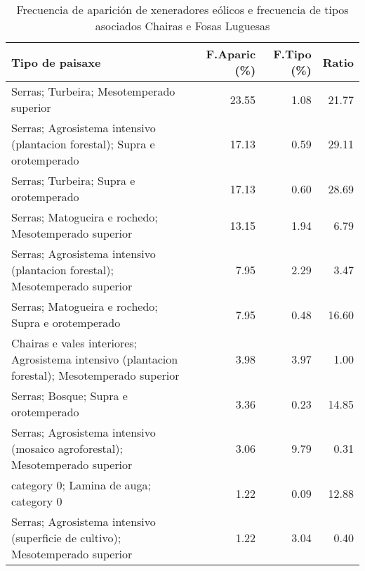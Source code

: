 \begin{table}[p]
\centering
\caption{Frecuencia de aparición de xeneradores eólicos e frecuencia de tipos asociados Chairas e Fosas Luguesas} 
\label{veolico6}
\begin{tabular}{lrrr}
  \hline
Tipo de paisaxe & F.Aparic (\%) & F.Tipo (\%) & Ratio \\ 
  \hline
Serras; Turbeira; Mesotemperado superior & 23.55 & 1.08 & 21.77 \\ 
  Serras; Agrosistema intensivo (plantacion forestal); Supra e orotemperado & 17.13 & 0.59 & 29.11 \\ 
  Serras; Turbeira; Supra e orotemperado & 17.13 & 0.60 & 28.69 \\ 
  Serras; Matogueira e rochedo; Mesotemperado superior & 13.15 & 1.94 & 6.79 \\ 
  Serras; Agrosistema intensivo (plantacion forestal); Mesotemperado superior & 7.95 & 2.29 & 3.47 \\ 
  Serras; Matogueira e rochedo; Supra e orotemperado & 7.95 & 0.48 & 16.60 \\ 
  Chairas e vales interiores; Agrosistema intensivo (plantacion forestal); Mesotemperado superior & 3.98 & 3.97 & 1.00 \\ 
  Serras; Bosque; Supra e orotemperado & 3.36 & 0.23 & 14.85 \\ 
  Serras; Agrosistema intensivo (mosaico agroforestal); Mesotemperado superior & 3.06 & 9.79 & 0.31 \\ 
  category 0; Lamina de auga; category 0 & 1.22 & 0.09 & 12.88 \\ 
  Serras; Agrosistema intensivo (superficie de cultivo); Mesotemperado superior & 1.22 & 3.04 & 0.40 \\ 
   \hline
\end{tabular}
\end{table}
